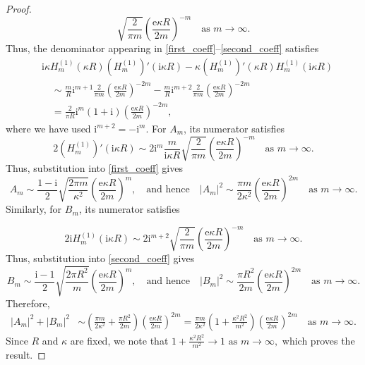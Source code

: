 \documentclass{article}
\begin{document}
\begin{proof}
\[\sqrt{\frac{2}{\pi m}}
\left(\frac{\mathrm e\kappa R}{2m}\right)^{-m} \quad \text{as $m\to\infty$.}
\]
Thus, the denominator appearing in \eqref{first_coeff}--\eqref{second_coeff}
satisfies
\begin{align*}
&\mathrm i\kappa H_m^{(1)}(\kappa R)(H_m^{(1)})'(\mathrm i\kappa R)
-\kappa(H_m^{(1)})'(\kappa R)H_m^{(1)}(\mathrm i\kappa R)
\\
&\quad\sim
\frac{m}{R}\mathrm i^{m+1}
\frac{2}{\pi m}
\left(\frac{\mathrm e\kappa R}{2m}\right)^{-2m}
-
\frac{m}{R}\mathrm i^{m+2}
\frac{2}{\pi m}
\left(\frac{\mathrm e\kappa R}{2m}\right)^{-2m}
\\
&\quad=
\frac{2}{\pi R}\mathrm i^m(1+\mathrm i)
\left(\frac{\mathrm e\kappa R}{2m}\right)^{-2m},
\end{align*}
where we have used $\mathrm i^{m+2}=-\mathrm i^m$.
For $A_m$, its numerator satisfies
$$
2(H_m^{(1)})'(\mathrm i\kappa R)
\sim
2\mathrm i^m\frac{m}{\mathrm i\kappa R}
\sqrt{\frac{2}{\pi m}}
\left(\frac{\mathrm e\kappa R}{2m}\right)^{-m}
\quad \text{as $m\to\infty$.}
$$
Thus, substitution into \eqref{first_coeff} gives
$$
A_m
\sim
\frac{1-\mathrm i}{2}
\sqrt{\frac{2\pi m}{\kappa^2}}
\left(\frac{\mathrm e\kappa R}{2m}\right)^m,
\quad \text{and hence} \quad
|A_m|^2
\sim
\frac{\pi m}{2\kappa^2}
\left(\frac{\mathrm e\kappa R}{2m}\right)^{2m}
\quad \text{as $m\to\infty$.}
$$
Similarly, for $B_m$, its numerator satisfies

$$
2\mathrm i H_m^{(1)}(\mathrm i\kappa R)
\sim
2\mathrm i^{m+2}
\sqrt{\frac{2}{\pi m}}
\left(\frac{\mathrm e\kappa R}{2m}\right)^{-m}
\quad \text{as $m\to\infty$.}
$$
Thus, substitution into \eqref{second_coeff} gives
$$
B_m
\sim
\frac{\mathrm i-1}{2}
\sqrt{\frac{2\pi R^2}{m}}
\left(\frac{\mathrm e\kappa R}{2m}\right)^m,
\quad \text{and hence} \quad
|B_m|^2
\sim
\frac{\pi R^2}{2m}
\left(\frac{\mathrm e\kappa R}{2m}\right)^{2m}
\quad \text{as $m\to\infty$.}
$$
Therefore,
\begin{align*}
|A_m|^2+|B_m|^2
&\sim
\left(
\frac{\pi m}{2\kappa^2}
+
\frac{\pi R^2}{2m}
\right)
\left(\frac{\mathrm e\kappa R}{2m}\right)^{2m}
=
\frac{\pi m}{2\kappa^2}
\left(
1+\frac{\kappa^2R^2}{m^2}
\right)
\left(\frac{\mathrm e\kappa R}{2m}\right)^{2m}
\quad \text{as $m\to\infty$.}
\end{align*}
Since $R$ and $\kappa$ are fixed, we note that
$
1+\frac{\kappa^2R^2}{m^2}\longrightarrow 1
\text{ as }m\to\infty,
$ which proves the result.
\end{proof}
\end{document}
